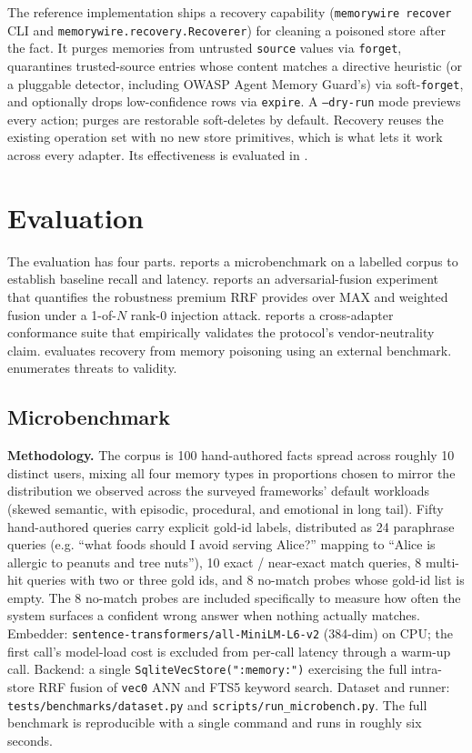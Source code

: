 \documentclass[11pt,letterpaper,twocolumn]{article}
\begin{document}
The reference implementation ships a recovery capability (\texttt{memorywire recover} CLI and \texttt{memorywire.recovery.Recoverer}) for cleaning a poisoned store after the fact. It purges memories from untrusted \texttt{source} values via \texttt{forget}, quarantines trusted-source entries whose content matches a directive heuristic (or a pluggable detector, including OWASP Agent Memory Guard's) via soft-\texttt{forget}, and optionally drops low-confidence rows via \texttt{expire}. A \texttt{--dry-run} mode previews every action; purges are restorable soft-deletes by default. Recovery reuses the existing operation set with no new store primitives, which is what lets it work across every adapter. Its effectiveness is evaluated in .

\section{Evaluation}
\label{sec:eval}

The evaluation has four parts.  reports a microbenchmark on a labelled corpus to establish baseline recall and latency.  reports an adversarial-fusion experiment that quantifies the robustness premium RRF provides over MAX and weighted fusion under a 1-of-$N$ rank-0 injection attack.  reports a cross-adapter conformance suite that empirically validates the protocol's vendor-neutrality claim.  evaluates recovery from memory poisoning using an external benchmark.  enumerates threats to validity.

\subsection{Microbenchmark}
\label{sec:eval-micro}

\textbf{Methodology.} The corpus is 100 hand-authored facts spread across roughly 10 distinct users, mixing all four memory types in proportions chosen to mirror the distribution we observed across the surveyed frameworks' default workloads (skewed semantic, with episodic, procedural, and emotional in long tail). Fifty hand-authored queries carry explicit gold-id labels, distributed as 24 paraphrase queries (e.g. ``what foods should I avoid serving Alice?'' mapping to ``Alice is allergic to peanuts and tree nuts''), 10 exact / near-exact match queries, 8 multi-hit queries with two or three gold ids, and 8 no-match probes whose gold-id list is empty. The 8 no-match probes are included specifically to measure how often the system surfaces a confident wrong answer when nothing actually matches. Embedder: \texttt{sentence-transformers/all-MiniLM-L6-v2} (384-dim) on CPU; the first call's model-load cost is excluded from per-call latency through a warm-up call. Backend: a single \texttt{SqliteVecStore(":memory:")} exercising the full intra-store RRF fusion of \texttt{vec0} ANN and FTS5 keyword search. Dataset and runner: \texttt{tests/benchmarks/dataset.py} and \texttt{scripts/run\_microbench.py}. The full benchmark is reproducible with a single command and runs in roughly six seconds.
\end{document}

